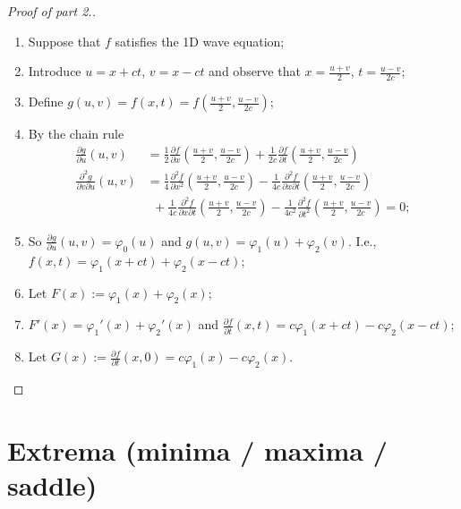 \begin{proof}[Proof of part 2.]
    \begin{enumerate}
        \item Suppose that \(f\) satisfies the 1D wave equation;
        \item Introduce \(u = x + ct\), \(v=x-ct\)
              and observe that \(x = \frac{u+v}{2}\), \(t=\frac{u-v}{2c}\);
        \item Define \(g(u,v) = f(x,t) = f(   \frac{u+v}{2} , \frac{u-v}{2c} )\);
        \item By the chain rule
              \[
                  \begin{aligned}
                      \tfrac{\partial g}{\partial u}(u,v)
                       & = \tfrac{1}{2} \tfrac{\partial f}{\partial x}(   \tfrac{u+v}{2} , \tfrac{u-v}{2c} )
                      + \tfrac{1}{2c} \tfrac{\partial f}{\partial t}(   \tfrac{u+v}{2} , \tfrac{u-v}{2c} )                      \\
                      \tfrac{\partial^2 g}{\partial v \partial u}(u,v)
                       & = \tfrac{1}{4} \tfrac{\partial^2 f}{\partial x^2}(   \tfrac{u+v}{2} , \tfrac{u-v}{2c} )
                      - \tfrac{1}{4c} \tfrac{\partial^2 f}{\partial x\partial t}(   \tfrac{u+v}{2} , \tfrac{u-v}{2c} )          \\
                       & \ \ +  \tfrac{1}{4c} \tfrac{\partial^2 f}{\partial x \partial t}(   \tfrac{u+v}{2} , \tfrac{u-v}{2c} )
                      -  \tfrac{1}{4c^2} \tfrac{\partial^2 f}{\partial t^2}(   \tfrac{u+v}{2} , \tfrac{u-v}{2c} ) = 0;
                  \end{aligned}
              \]
        \item So \( \tfrac{\partial g}{\partial u}(u,v) = \varphi_0(u)\) and \(g(u,v) = \varphi_1(u) + \varphi_2(v)\).
              I.e., \(f(x,t) = \varphi_1(x+ct) + \varphi_2(x-ct)\);
        \item Let \(F(x) := \varphi_1(x) + \varphi_2(x)\);
        \item \(F'(x) = \varphi_1'(x) + \varphi_2'(x)\)
              and \(\frac{\partial f}{\partial t}(x,t) = c\varphi_1(x+ct) - c\varphi_2(x-ct)\);
        \item Let \(G(x) := \frac{\partial f}{\partial t}(x,0) = c\varphi_1(x) - c\varphi_2(x)\).
    \end{enumerate}
\end{proof}



\section{Extrema (minima / maxima / saddle)}

